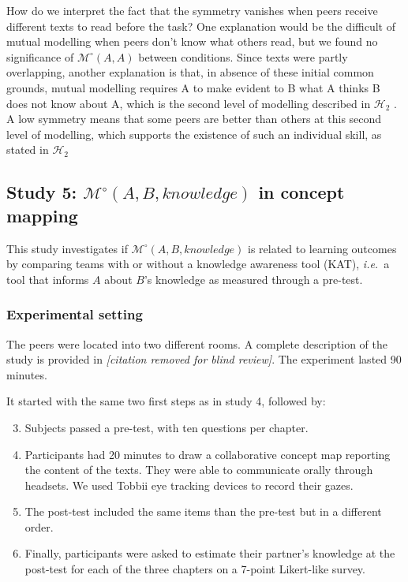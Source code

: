 \documentclass[natbib]{svjour3}
\newcommand{\ie}{{\textit{i.e.\ }}}
\newcommand{\Model}[3]{{$\mathcal{M}^{\circ}(#1, #2, #3)$}}
\newcommand{\gModel}[2]{{$\mathcal{M}^{\circ}(#1, #2)$}}
\begin{document}
How do we interpret the fact that the symmetry vanishes when peers receive
different texts to read before the task? One explanation would be the difficult
of mutual modelling when peers don't know what others read, but we found no
significance of \gModel{A}{A} between conditions. Since texts were partly
overlapping, another explanation is that, in absence of these initial common
grounds, mutual modelling requires A to make evident to B what A thinks B does
not know about A, which is the second level of modelling described in
$\mathcal{H}_{2}$ . A low symmetry means that some peers are better than others
at this second level of modelling, which supports the existence of such an
individual skill, as stated in  $\mathcal{H}_{2}$ 

\subsection{{\bf Study 5}: \Model{A}{B}{knowledge} in concept mapping}

This study investigates if \Model{A}{B}{knowledge} is related to learning
outcomes by comparing teams with or without a knowledge awareness tool (KAT),
\ie a tool that informs $A$ about $B$'s knowledge as measured through a pre-test.

\subsubsection*{Experimental setting}

The peers were located into two different rooms. A complete description of the
study is provided in \textit{[citation removed for blind review]}. The experiment lasted 90 minutes.

It started with the same two first steps as in study 4, followed by:

\begin{enumerate}
    \setcounter{enumi}{2}

    \item Subjects passed a pre-test, with ten questions per chapter. 

    \item Participants had 20 minutes to draw a collaborative concept map
        reporting the content of the texts. They were able to communicate
        orally through headsets.  We used Tobbii eye tracking devices to
        record their gazes.

    \item The post-test included the same items than the pre-test but in a
        different order. 

    \item  Finally, participants were asked to estimate their partner's
        knowledge at the post-test for each of the three chapters on a 7-point
        Likert-like survey. 

\end{enumerate}
\end{document}
